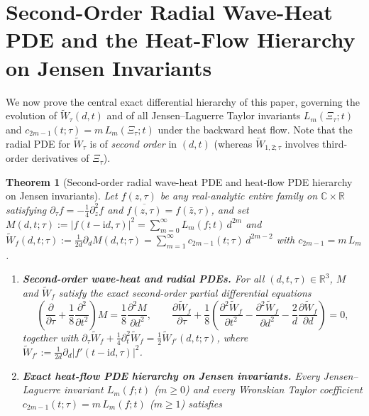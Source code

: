 \documentclass[11pt,reqno]{amsart}
\theoremstyle{plain}
\newtheorem{theorem}{Theorem}[section]
\theoremstyle{definition}
\theoremstyle{remark}
\numberwithin{equation}{section}
\newcommand{\ii}{\mathrm{i}}
\begin{document}
\section{Second-Order Radial Wave-Heat PDE and the Heat-Flow Hierarchy on Jensen Invariants}\label{sec:hierarchy}

We now prove the central exact differential hierarchy of this paper, governing the evolution of $\widetilde{W}_\tau(d,t)$ and of all Jensen--Laguerre Taylor invariants $L_m(\Xi_\tau; t)$ and $c_{2m-1}(t;\tau) = m\,L_m(\Xi_\tau; t)$ under the backward heat flow. Note that the radial PDE for $\widetilde{W}_\tau$ is of \emph{second order} in $(d,t)$ (whereas $\widetilde{W}_{1,2;\tau}$ involves third-order derivatives of $\Xi_\tau$).

\begin{theorem}[Second-order radial wave-heat PDE and heat-flow PDE hierarchy on Jensen invariants]\label{thm:jensen_pde}
Let $f(z,\tau)$ be any real-analytic entire family on $\mathbb{C} \times \mathbb{R}$ satisfying $\partial_\tau f = -\frac{1}{4}\partial_z^2 f$ and $\overline{f(z,\tau)} = f(\bar{z},\tau)$, and set $M(d,t;\tau) := \lvert f(t - \ii d,\tau)\rvert^2 = \sum_{m=0}^\infty L_m(f; t)\,d^{2m}$ and $\widetilde{W}_f(d,t;\tau) := \frac{1}{2d}\partial_d M(d,t;\tau) = \sum_{m=1}^\infty c_{2m-1}(t;\tau)\,d^{2m-2}$ with $c_{2m-1} = m\,L_m$.
\begin{enumerate}[label=\textup{(\roman*)},leftmargin=2.2em]
\item \textbf{Second-order wave-heat and radial PDEs.} For all $(d,t,\tau) \in \mathbb{R}^3$, $M$ and $\widetilde{W}_f$ satisfy the exact second-order partial differential equations
\begin{equation}\label{eq:wave_heat_M_W}
\left(\frac{\partial}{\partial\tau} + \frac{1}{8}\frac{\partial^2}{\partial t^2}\right) M = \frac{1}{8}\frac{\partial^2 M}{\partial d^2}, \qquad \frac{\partial\widetilde{W}_f}{\partial\tau} + \frac{1}{8}\left(\frac{\partial^2\widetilde{W}_f}{\partial t^2} - \frac{\partial^2\widetilde{W}_f}{\partial d^2} - \frac{2}{d}\frac{\partial\widetilde{W}_f}{\partial d}\right) = 0,
\end{equation}
together with $\partial_\tau\widetilde{W}_f + \frac{1}{4}\partial_t^2\widetilde{W}_f = \frac{1}{2}\widetilde{W}_{f'}(d,t;\tau)$, where $\widetilde{W}_{f'} := \frac{1}{2d}\partial_d\lvert f'(t - \ii d,\tau)\rvert^2$.
\item \textbf{Exact heat-flow PDE hierarchy on Jensen invariants.} Every Jensen--Laguerre invariant $L_m(f; t)$ ($m \ge 0$) and every Wronskian Taylor coefficient $c_{2m-1}(t;\tau) = m\,L_m(f; t)$ ($m \ge 1$) satisfies

\end{enumerate}
\end{theorem}
\end{document}
